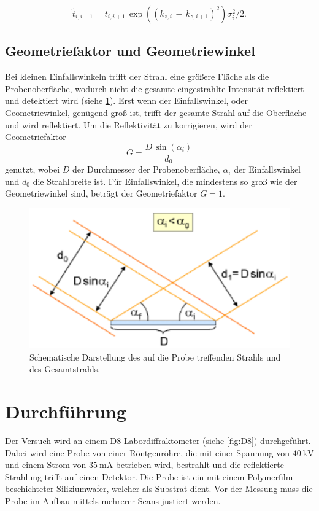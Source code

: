 \begin{equation}
    \tilde{t}_{i,i+1} = t_{i,i+1} \, \exp((k_{z,i} \, - \, k_{z,i+1})^2) \sigma^2_i / 2.
\end{equation}



\subsection{Geometriefaktor und Geometriewinkel}
Bei kleinen Einfallswinkeln trifft der Strahl eine größere Fläche als die Probenoberfläche, wodurch nicht die gesamte eingestrahlte Intensität reflektiert und detektiert wird (siehe \ref{fig:Geometriewinkel}).
Erst wenn der Einfallswinkel, oder Geometriewinkel, genügend groß ist, trifft der gesamte Strahl auf die Oberfläche und wird reflektiert.
Um die Reflektivität zu korrigieren, wird der Geometriefaktor
\begin{equation}
    G = \frac{D \, \sin(\alpha_i)}{d_0}
    \label{eq:Geometriefaktor}
\end{equation}
genutzt, wobei $D$ der Durchmesser der Probenoberfläche, $\alpha_i$ der Einfallswinkel und $d_0$ die Strahlbreite ist.
Für Einfallswinkel, die mindestens so groß wie der Geometriewinkel sind, beträgt der Geometriefaktor $G = 1$. 

\begin{figure}
    \centering
    \includegraphics[width=0.7\linewidth]{./figures/Geometriewinkel.png}
    \caption{Schematische Darstellung des auf die Probe treffenden Strahls und des Gesamtstrahls. \cite{anleitung}} %
    \label{fig:Geometriewinkel}
\end{figure}



\section{Durchführung}
\label{sec:durchfuehrung}

Der Versuch wird an einem D8-Labordiffraktometer (siehe \ref{fig:D8}) durchgeführt.
Dabei wird eine Probe von einer Röntgenröhre, die mit einer Spannung von $\SI{40}{\kilo\volt}$ und einem Strom von $\SI{35}{\milli\ampere}$ betrieben wird, bestrahlt und die reflektierte Strahlung trifft auf einen Detektor. %
Die Probe ist ein mit einem Polymerfilm beschichteter Siliziumwafer, welcher als Substrat dient.
Vor der Messung muss die Probe im Aufbau mittels mehrerer Scans justiert werden.

